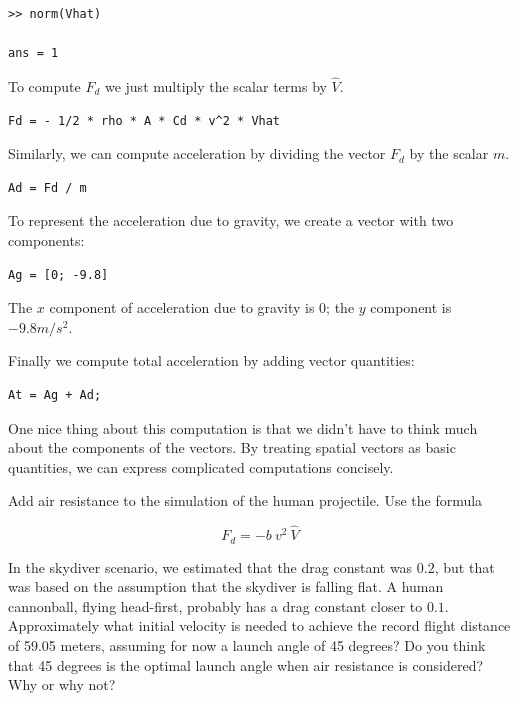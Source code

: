 \documentclass{book}
\newcommand{\uvec}[1]{\hat{#1}}
\begin{document}
\begin{verbatim}
>> norm(Vhat)

ans = 1
\end{verbatim}

To compute $F_d$ we just multiply the scalar terms by $\uvec{V}$.

\begin{verbatim}
Fd = - 1/2 * rho * A * Cd * v^2 * Vhat
\end{verbatim}

Similarly, we can compute acceleration by dividing the vector
$F_d$ by the scalar $m$.

\begin{verbatim}
Ad = Fd / m
\end{verbatim}

To represent the acceleration due to gravity, we create a vector
with two components:

\begin{verbatim}
Ag = [0; -9.8]
\end{verbatim}

The $x$ component of acceleration due to gravity is 0; the $y$ component is $-9.8 m/s^2$.

Finally we compute total acceleration by adding vector
quantities:

\begin{verbatim}
At = Ag + Ad;
\end{verbatim}

One nice thing about this computation is that we didn't have to
think much about the components of the vectors.  By treating
spatial vectors as basic quantities, we can express complicated computations
concisely.

\begin{ex}
Add air resistance to the simulation of the human projectile.
Use the formula

\begin{equation}
F_d = -b ~ v^2 ~ \uvec{V}
\end{equation}

In
the skydiver scenario, we estimated that the drag constant was
$0.2$, but that was based on the assumption that the skydiver is
falling flat.  A human cannonball, flying head-first, probably
has a drag constant closer to $0.1$.  Approximately what initial velocity
is needed to achieve the record flight distance of 59.05 meters,
assuming
for now a launch angle of 45 degrees?
Do you think that 45 degrees is the optimal launch angle when
air resistance is considered?  Why or why not?
\end{ex}
\end{document}
